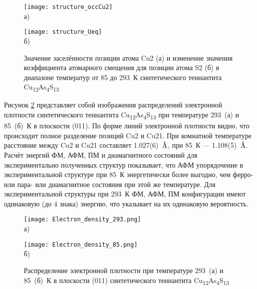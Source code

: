 \begin{figure}[ht]
  \begin{minipage}[ht]{0.5\linewidth}\centering
    \texttt{[image: structure\_occCu2]} \\ а)
  \end{minipage}
  \hfill
  \begin{minipage}[ht]{0.5\linewidth}\centering
    \texttt{[image: structure\_Ueq]} \\ б)
  \end{minipage}

      \caption[Значение заселённости позиции атома Cu2 (а) и изменение значения коэффициента атомарного смещения для позиции атома S2 (б) в диапазоне температур от 85 до 293~К синтетического теннантита Cu\textsubscript{12}As\textsubscript{4}S\textsubscript{13}]{Значение заселённости позиции атома Cu2 (а) и изменение значения коэффициента атомарного смещения для позиции атома S2 (б) в диапазоне температур от 85 до 293~К синтетического теннантита Cu\textsubscript{12}As\textsubscript{4}S\textsubscript{13}}
    \label{img:xray}
\end{figure}

Рисунок \ref{img:xray2} представляет собой изображения распределений электронной плотности синтетического теннантита Cu\textsubscript{12}As\textsubscript{4}S\textsubscript{13} при температуре 293~(а) и 85~(б)~К в плоскости (011). По форме линий электронной плотности видно, что происходит полное разделение позиций Cu2 и Cu21. При комнатной температуре расстояние между Cu2 и Cu21 составляет 1.027(6)~$\mbox{\normalfont\AA}$, при 85~К --- 1.108(5)~$\mbox{\normalfont\AA}$. Расчёт энергий ФМ, АФМ, ПМ и диамагнитного состояний для экспериментально полученных структур показывает, что АФМ упорядочение в экспериментальной структуре при 85~К энергетически более выгодно, чем ферро- или пара- или диамагнитное состояния при этой же температуре. Для экспериментальной структуры при 293~К ФМ, АФМ, ПМ конфигурации имеют одинаковую (до 4 знака) энергию, что указывает на их одинаковую вероятность.

\begin{figure}[ht]
  \begin{minipage}[ht]{0.5\linewidth}\centering
    \texttt{[image: Electron\_density\_293.png]} \\ а)
  \end{minipage}
  \hfill
  \begin{minipage}[ht]{0.5\linewidth}\centering
    \texttt{[image: Electron\_density\_85.png]} \\ б)
  \end{minipage}

      \caption[Распределение электронной плотности при температуре 293~(а) и 85~(б)~К в плоскости (011) синтетического теннантита Cu\textsubscript{12}As\textsubscript{4}S\textsubscript{13}]{Распределение электронной плотности при температуре 293~(а) и 85~(б)~К в плоскости (011) синтетического теннантита Cu\textsubscript{12}As\textsubscript{4}S\textsubscript{13}}
    \label{img:xray2}
\end{figure}


